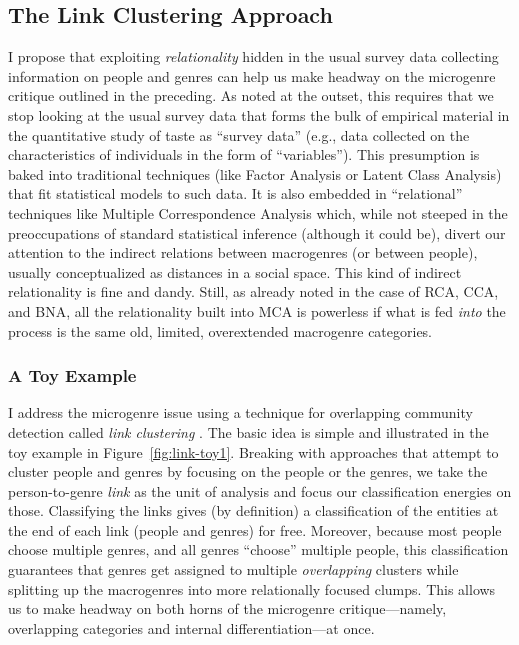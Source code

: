 \documentclass[a4paper,12pt]{extarticle}
\begin{document}
\subsection{The Link Clustering Approach}
I propose that exploiting {\em relationality} hidden in the usual survey data collecting information on people and genres can help us make headway on the microgenre critique outlined in the preceding. As noted at the outset, this requires that we stop looking at the usual survey data that forms the bulk of empirical material in the quantitative study of taste as ``survey data'' (e.g., data collected on the characteristics of individuals in the form of ``variables''). This presumption is baked into traditional techniques (like Factor Analysis or Latent Class Analysis) that fit statistical models to such data. It is also embedded in ``relational'' techniques like Multiple Correspondence Analysis which, while not steeped in the preoccupations of standard statistical inference (although it could be), divert our attention to the indirect relations between macrogenres (or between people), usually conceptualized as distances in a social space. This kind of indirect relationality is fine and dandy. Still, as already noted in the case of RCA, CCA, and BNA, all the relationality built into MCA is powerless if what is fed {\em into} the process is the same old, limited, overextended macrogenre categories. 

\subsubsection{A Toy Example}
I address the microgenre issue using a technique for overlapping community detection called \textit{link clustering} \citep{ahn_etal10}. The basic idea is simple and illustrated in the toy example in Figure~\ref{fig:link-toy1}. Breaking with approaches that attempt to cluster people and genres by focusing on the people or the genres, we take the person-to-genre {\em link} as the unit of analysis and focus our classification energies on those. Classifying the links gives (by definition) a classification of the entities at the end of each link (people and genres) for free. Moreover, because most people choose multiple genres, and all genres ``choose'' multiple people, this classification guarantees that genres get assigned to multiple \textit{overlapping} clusters while splitting up the macrogenres into more relationally focused clumps. This allows us to make headway on both horns of the microgenre critique---namely, overlapping categories and internal differentiation---at once.
\end{document}
